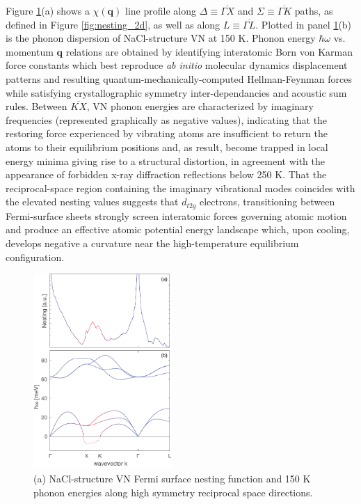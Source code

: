 \documentclass[twocolumn,showpacs,preprintnumbers,superscriptaddress,prb,floatfix,aps,10pt]{revtex4-1}
\renewcommand{\vec}[1]{\ensuremath{\mathbf{#1}}}
\newcommand*{\nesting}{\chi(\vec{q})}
\begin{document}
Figure \ref{fig:nesting_1d}(a) shows a $\nesting$ line profile along $\Delta \equiv \overline{\Gamma X}$ and $\Sigma \equiv \overline{\Gamma K}$ paths, as defined in Figure \ref{fig:nesting_2d}, as well as along $L\equiv\overline{\Gamma L}$. Plotted in panel \ref{fig:nesting_1d}(b) is the phonon dispersion of NaCl-structure VN at 150 K. Phonon energy $\hbar\omega$ vs. momentum $\vec{q}$ relations are obtained by identifying interatomic Born von Karman force constants which best reproduce \emph{ab initio} molecular dynamics displacement patterns and resulting quantum-mechanically-computed Hellman-Feynman forces while satisfying crystallographic symmetry inter-dependancies and acoustic sum rules. Between $\overline{KX}$, VN phonon energies are characterized by imaginary frequencies (represented graphically as negative values), indicating that the restoring force experienced by vibrating atoms are insufficient to return the atoms to their equilibrium positions and, as result, become trapped in local energy minima giving rise to a structural distortion, in agreement with the appearance of forbidden x-ray diffraction reflections below 250 K. That the reciprocal-space region containing the imaginary vibrational modes coincides with the elevated nesting values suggests that $d_{t2g}$ electrons, transitioning between Fermi-surface sheets strongly screen interatomic forces governing atomic motion and produce an effective atomic potential energy landscape which, upon cooling, develops negative a curvature near the high-temperature equilibrium configuration.
%
\begin{figure}[h]
\includegraphics[width=0.47\textwidth]{Figure_4_nesting_1d.pdf}
\caption{\label{fig:nesting_1d} (a) NaCl-structure VN Fermi surface nesting function and 150 K phonon energies along high symmetry reciprocal space directions.}
\end{figure}
%
\end{document}
